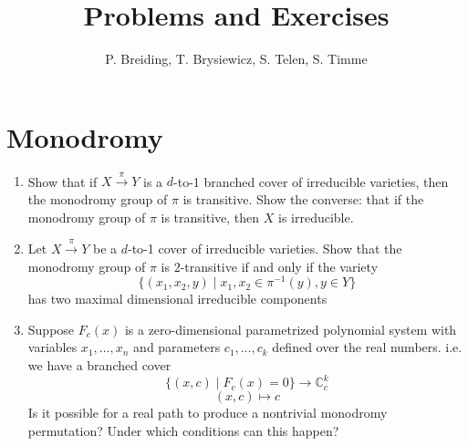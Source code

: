 \documentclass[11pt,reqno]{amsart}
\title{Problems and Exercises}
\author{P. Breiding, T. Brysiewicz, S. Telen, S. Timme}
\theoremstyle{definition}
\theoremstyle{remark}
\numberwithin{equation}{section}
\begin{document}
\maketitle

\section{Monodromy}

\begin{enumerate}
\item  Show that if $X \xrightarrow{\pi} Y$ is a $d$-to-1 branched cover of irreducible varieties, then the monodromy group of $\pi$ is transitive. Show the converse: that if the monodromy group of $\pi$ is transitive, then $X$ is irreducible.

\item Let $X \xrightarrow{\pi} Y$ be a $d$-to-1 cover of irreducible varieties. Show that the monodromy group of $\pi$ is $2$-transitive if and only if the variety 
$$\{(x_1,x_2,y) \mid x_1,x_2 \in \pi^{-1}(y), y \in Y\}$$
has two maximal dimensional irreducible components 

\item Suppose $F_c(x)$ is a zero-dimensional parametrized polynomial system with variables $x_1,\ldots,x_n$ and parameters $c_1,\ldots,c_k$ defined over the real numbers. i.e. we have a branched cover 
$$\{(x,c) \mid F_c(x)=0\} \to \mathbb{C}_c^k$$
$$(x,c) \mapsto c$$
 Is it possible for a real path to produce a nontrivial monodromy permutation? Under which conditions can this happen?


\end{enumerate}
\end{document}
